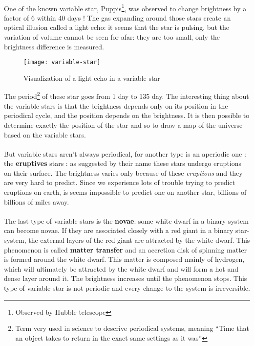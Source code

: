\documentclass[a4paper, 11pt]{article} %
\begin{document}
\paragraph*{}
One of the known variable star, Puppis\footnote{Observed by Hubble telescope}, was observed to change brightness by a factor of 6 within 40 days ! The gas expanding around those stars create an optical illusion called a light echo: it seems that the star is pulsing, but the variation of volume cannot be seen for afar: they are too small, only the brightness difference is measured.

\begin{figure}[h]
\centering
\texttt{[image: variable-star]}
\caption{Visualization of a light echo in a variable star}
\end{figure}

The period\footnote{Term very used in science to descrive periodical systems, meaning ``Time that an object takes to return in the exact same settings as it was''}  of these star goes from 1 day to 135 day. The interesting thing about the variable stars is that the brightness depends only on its position in the periodical cycle, and the position depends on the brightness. It is then possible to determine exactly the position of the star and so to draw a map of the universe based on the variable stars.
 
\paragraph*{} 
But variable stars aren't always periodical, for another type is an aperiodic one : the \textbf{eruptives} stars : as suggested by their name these stars undergo eruptions on their surface. The brightness varies only because of these \textit{eruptions} and they are very hard to predict. Since we experience lots of trouble trying to predict eruptions on earth, is seems impossible to predict one on another star, billions of billions of miles away.

\paragraph*{}
The last type of variable stars is the \textbf{novae}: some white dwarf in a binary system can become novae. If they are associated closely with a red giant in a binary star-system, the external layers of the red giant are attracted by the white dwarf. This phenomenon is called \textbf{matter transfer} and an accretion disk of spinning matter is formed around the white dwarf. This matter is composed mainly of hydrogen, which will ultimately be attracted by the white dwarf and will form a hot and dense layer around it. The brightness increases until the phenomenon stops. This type of variable star is not periodic and every change to the system is irreversible. 
\end{document}
